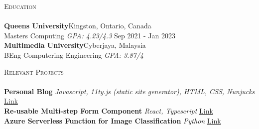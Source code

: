 \documentclass[a4paper]{article}
\newcommand{\lineunder} {
    \vspace*{-8pt} \\
    \hspace*{-18pt} \hrulefill \\
}
\newcommand{\header} [1] {
    {\hspace*{-18pt}\vspace*{6pt} \textsc{#1}}
    \vspace*{-6pt} \lineunder
}
\begin{document}
\header{Education}
\textbf{Queen\textquotesingle{}s University}\hfill Kingston, Ontario, Canada\\
Master\textquotesingle{}s Computing \textit{GPA: 4.23/4.3} \hfill Sep 2021 - Jan 2023\\
\vspace{2mm}
\textbf{Multimedia University}\hfill Cyberjaya, Malaysia\\
BEng Computering Engineering \textit{GPA: 3.87/4}\\
\vspace{2mm}

\header{Relevant Projects}
{\textbf{Personal Blog}} {\sl Javascript, 11ty.js (static site generator), HTML, CSS, Nunjucks} \hfill \href{https://github.com/rohanfaiyazkhan/rohanfaiyaz-new}{Link} \\
\vspace*{2mm}
{\textbf{Re-usable Multi-step Form Component}} {\sl React, Typescript} \hfill \href{https://github.com/rohanfaiyazkhan/stepper}{Link} \\
\vspace*{2mm}
{\textbf{Azure Serverless Function for Image Classification}} {\sl Python} \hfill \href{https://github.com/rohanfaiyazkhan/azure-function-image-classifier}{Link} \\
\end{document}
